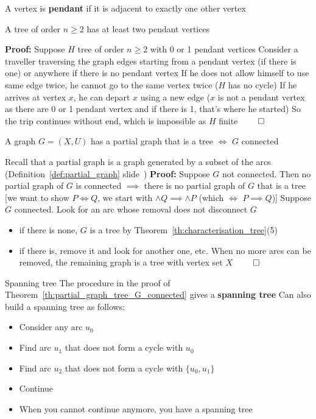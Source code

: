 \documentclass[aspectratio=169]{beamer}
\begin{document}
\begin{frame}
\begin{definition}
A vertex is \textbf{pendant} if it is adjacent to exactly one other vertex
\end{definition}
\vfill
\begin{theorem}
A tree of order $n\geq 2$ has at least two pendant vertices
\end{theorem}
\vfill
\textbf{Proof:} 
Suppose $H$ tree of order $n\geq 2$ with 0 or 1 pendant vertices
\vskip0.5cm
Consider a traveller traversing the graph edges starting from a pendant vertex (if there is one) or anywhere if there is no pendant vertex
\vskip0.5cm
If he does not allow himself to use same edge twice, he cannot go to the same vertex twice ($H$ has no cycle)
\vskip0.5cm
If he arrives at vertex $x$, he can depart $x$ using a new edge ($x$ is not a pendant vertex as there are 0 or 1 pendant vertex and if there is 1, that's where he started)
\vskip0.5cm
So the trip continues without end, which is impossible as $H$ finite $\qed$
\end{frame}

\begin{frame}
\begin{theorem}\label{th:partial_graph_tree_G_connected}
A graph $G=(X,U)$ has a partial graph that is a tree $\iff$ $G$ connected
\end{theorem}
\vfill
Recall that a partial graph is a graph generated by a subset of the arcs (Definition~\ref{def:partial_graph} slide~\pageref{def:partial_graph})
\vfill
\textbf{Proof:}
Suppose $G$ not connected. Then no partial graph of $G$ is connected $\implies$ there is no partial graph of $G$ that is a tree [we want to show $P\iff Q$, we start with $\wedge Q\implies \wedge P$ (which $\iff$ $P\implies Q$)]
\vskip1cm
Suppose $G$ connected. Look for an arc whose removal does not disconnect $G$
\begin{itemize}
\item if there is none, $G$ is a tree by Theorem~\ref{th:characterisation_tree}(5)
\item if there is, remove it and look for another one, etc. When no more arcs can be removed, the remaining graph is a tree with vertex set $X$ $\qed$
\end{itemize}
\end{frame}

\begin{frame}{Spanning tree}
The procedure in the proof of Theorem~\ref{th:partial_graph_tree_G_connected} gives a \textbf{spanning tree}
\vfill
Can also build a spanning tree as follows:
\begin{itemize}
\item Consider any arc $u_0$
\item Find arc $u_1$ that does not form a cycle with $u_0$
\item Find arc $u_2$ that does not form a cycle with $\{u_0,u_1\}$
\item Continue
\item When you cannot continue anymore, you have a spanning tree
\end{itemize}
\end{frame}
\end{document}
